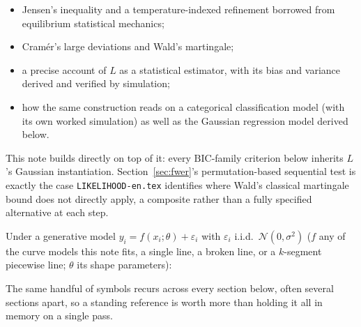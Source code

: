\documentclass[11pt]{article}
\newcommand{\code}[1]{\texttt{#1}}
\begin{document}
\begin{itemize}[noitemsep]
\item Jensen's inequality and a temperature-indexed refinement borrowed
from equilibrium statistical mechanics;
\item Cram\'er's large deviations and Wald's martingale;
\item a precise account of $L$ as a statistical estimator, with its bias
and variance derived and verified by simulation;
\item how the same construction reads on a categorical classification
model (with its own worked simulation) as well as the Gaussian
regression model derived below.
\end{itemize}

This note builds directly on top of it: every
$\mathrm{BIC}$-family criterion below inherits $L$'s Gaussian
instantiation. Section~\ref{sec:fwer}'s permutation-based sequential
test is exactly the case \code{LIKELIHOOD-en.tex} identifies where
Wald's classical martingale bound does not directly apply, a composite
rather than a fully specified alternative at each step.

Under a generative model
$y_i = f(x_i;\theta) + \varepsilon_i$ with $\varepsilon_i$ i.i.d.\
$\mathcal N(0,\sigma^2)$ ($f$ any of the curve models this note fits, a
single line, a broken line, or a $k$-segment piecewise line; $\theta$ its
shape parameters):

\begin{center}
\end{center}

The same handful of symbols recurs across every section below, often
several sections apart, so a standing reference is worth more than
holding it all in memory on a single pass.
\end{document}
